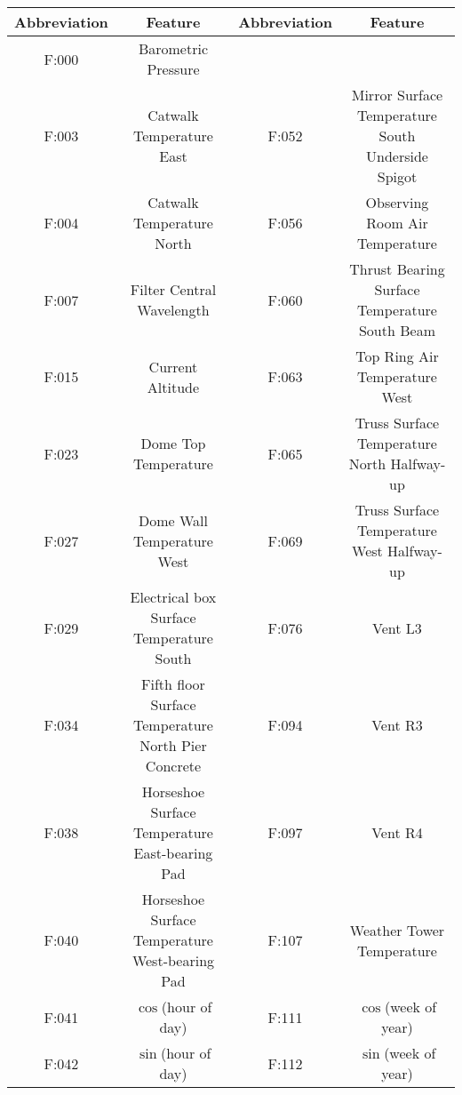 \begin{figure*}
\iffalse
\begin{tabular}{cccc}
\toprule
Abbreviation &                                        Feature & Abbreviation &                                      Feature \\
\midrule
       F:000 &                             Barometric Pressure &          &                                \\
       F:003 &                         Catwalk Temperature East &         F:052 &  Mirror Surface Temperature South Underside Spigot \\
       F:004 &                        Catwalk Temperature North &         F:056 &                   Observing Room Air Temperature \\
       F:007 &                                 Filter Central Wavelength &         F:060 &      Thrust Bearing Surface Temperature South Beam \\
       F:015 &                                     Current Altitude &         F:063 &                     Top Ring Air Temperature West \\
       F:023 &                             Dome Top Temperature &         F:065 &         Truss Surface Temperature North Halfway-up \\
       F:027 &                        Dome Wall Temperature West &         F:069 &          Truss Surface Temperature West Halfway-up \\
       F:029 &           Electrical box Surface Temperature South &         F:076 &                                       Vent L3 \\
       F:034 &  Fifth floor Surface Temperature North Pier Concrete &         F:094 &                                       Vent R3 \\
       F:038 &      Horseshoe Surface Temperature East-bearing Pad &         F:097 &                                       Vent R4 \\
       F:040 &      Horseshoe Surface Temperature West-bearing Pad &         F:107 &                      Weather Tower Temperature \\
       F:041 &                                $\cos$(hour of day) &         F:111 &                              $\cos$(week of year) \\
       F:042 &                                $\sin$(hour of day) &         F:112 &                              $\sin$(week of year) \\

\end{tabular}
\end{figure*}

